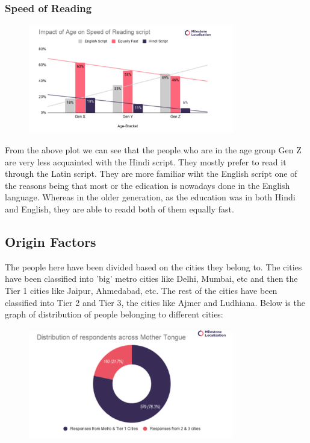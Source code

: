 \documentclass{article}
\begin{document}
\subsubsection{Speed of Reading}

\begin{figure}[H]
    \centering
    \includegraphics[width=0.8\textwidth]{plots/age_faster_read.png}
\end{figure}

From the above plot we can see that the people who are in the age group Gen Z are very less acquainted with the Hindi script. They mostly prefer to read it through the Latin script. They are more familiar wiht the English script one of the reasons being that most or the edication is nowadays done in the English language. Whereas in the older generation, as the education was in both Hindi and English, they are able to readd both of them equally fast.

\subsection{Origin Factors}

The people here have been divided based on the cities they belong to. The cities have been classified into 'big' metro cities like Delhi, Mumbai, etc and then the Tier 1 cities like Jaipur, Ahmedabad, etc. The rest of the cities have been classified into Tier 2 and Tier 3, the cities like Ajmer and Ludhiana. Below is the graph of distribution of people belonging to different cities:

\begin{figure}[H]
    \centering
    \includegraphics[width=0.8\textwidth]{plots/distribution_with_city.png}
\end{figure}
\end{document}
